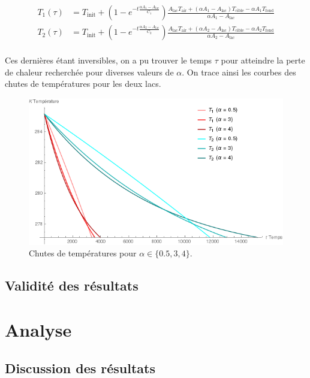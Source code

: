 \documentclass[12pt]{article}
\numberwithin{figure}{section}
\begin{document}
\begin{align*}
    T_1(\tau) &=
        T_\text{init} +
            \left(1-e^{\textstyle -t\frac{\alpha A_1-A_\text{lac}}{C_1}}\right)
            \frac
                {A_\text{lac} T_\text{air} + (\alpha A_1-A_\text{lac})T_\text{cible} - \alpha A_1 T_\text{fond}}
                {\alpha A_1-A_\text{lac}}\\
    T_2(\tau) &=
        T_\text{init} +
            \left(1-e^{\textstyle -t\frac{\alpha A_2-A_\text{lac}}{C_2}}\right)
            \frac
                {A_\text{lac} T_\text{air} + (\alpha A_2-A_\text{lac})T_\text{cible} - \alpha A_2 T_\text{fond}}
                {\alpha A_2-A_\text{lac}}\\
\end{align*}

Ces derni\`eres \'etant inversibles, on a pu trouver le temps $\tau$ pour atteindre la perte de
chaleur recherch\'ee pour diverses valeurs de $\alpha$. On trace ainsi les courbes des chutes de
temp\'eratures pour les deux lacs.

\begin{figure}
    \centering
    \includegraphics[scale=0.7]{Alpha.png}
    \caption{Chutes de temp\'eratures pour $\alpha \in \{0.5, 3, 4\}$.}
\end{figure}

\subsection{Validit\'e des r\'esultats}

\section{Analyse}
\subsection{Discussion des r\'esultats}
\end{document}
